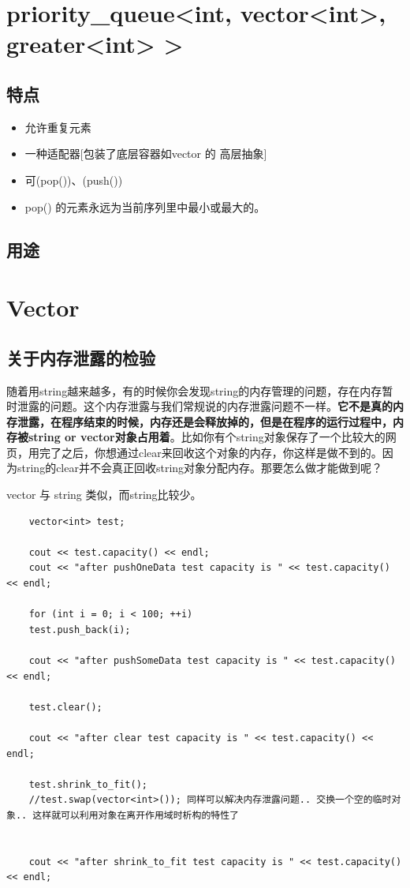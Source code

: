 \documentclass[UTF8,a4paper,12pt]{ctexbook}
\begin{document}
\newpage
\section{priority\_queue<int, vector<int>, greater<int> >}
	\subsection{特点}
		\begin{itemize}
			\item 允许重复元素
			\item 一种适配器[包装了底层容器如vector 的 高层抽象]
			\item 可(pop())、(push())
			\item pop() 的元素永远为当前序列里中最小或最大的。
		\end{itemize}
	\subsection{用途}


\newpage
\section{Vector}
	\subsection{关于内存泄露的检验}
		随着用string越来越多，有的时候你会发现string的内存管理的问题，存在内存暂时泄露的问题。这个内存泄露与我们常规说的内存泄露问题不一样。\textbf{它不是真的内存泄露，在程序结束的时候，内存还是会释放掉的，但是在程序的运行过程中，内存被string or  vector对象占用着}。比如你有个string对象保存了一个比较大的网页，用完了之后，你想通过clear来回收这个对象的内存，你这样是做不到的。因为string的clear并不会真正回收string对象分配内存。那要怎么做才能做到呢？
		
		vector 与 string 类似，而string比较少。
		\begin{lstlisting}
	vector<int> test;
	
	cout << test.capacity() << endl;
	cout << "after pushOneData test capacity is " << test.capacity() << endl;
	
	for (int i = 0; i < 100; ++i)
	test.push_back(i);
	
	cout << "after pushSomeData test capacity is " << test.capacity() << endl;
	
	test.clear();
	
	cout << "after clear test capacity is " << test.capacity() << endl;
	
	test.shrink_to_fit();
	//test.swap(vector<int>()); 同样可以解决内存泄露问题.. 交换一个空的临时对象.. 这样就可以利用对象在离开作用域时析构的特性了
	
	
	cout << "after shrink_to_fit test capacity is " << test.capacity() << endl;
		\end{lstlisting}
\end{document}
